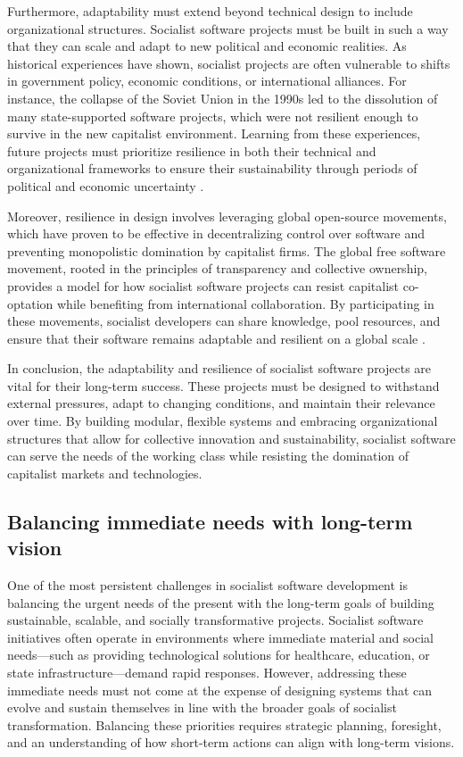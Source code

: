 \begin{refsection}
Furthermore, adaptability must extend beyond technical design to include organizational structures. Socialist software projects must be built in such a way that they can scale and adapt to new political and economic realities. As historical experiences have shown, socialist projects are often vulnerable to shifts in government policy, economic conditions, or international alliances. For instance, the collapse of the Soviet Union in the 1990s led to the dissolution of many state-supported software projects, which were not resilient enough to survive in the new capitalist environment. Learning from these experiences, future projects must prioritize resilience in both their technical and organizational frameworks to ensure their sustainability through periods of political and economic uncertainty \cite[pp.~210-215]{nove1991}.

Moreover, resilience in design involves leveraging global open-source movements, which have proven to be effective in decentralizing control over software and preventing monopolistic domination by capitalist firms. The global free software movement, rooted in the principles of transparency and collective ownership, provides a model for how socialist software projects can resist capitalist co-optation while benefiting from international collaboration. By participating in these movements, socialist developers can share knowledge, pool resources, and ensure that their software remains adaptable and resilient on a global scale \cite[pp.~78-82]{stallman2002}.

In conclusion, the adaptability and resilience of socialist software projects are vital for their long-term success. These projects must be designed to withstand external pressures, adapt to changing conditions, and maintain their relevance over time. By building modular, flexible systems and embracing organizational structures that allow for collective innovation and sustainability, socialist software can serve the needs of the working class while resisting the domination of capitalist markets and technologies.

\subsection{Balancing immediate needs with long-term vision}

One of the most persistent challenges in socialist software development is balancing the urgent needs of the present with the long-term goals of building sustainable, scalable, and socially transformative projects. Socialist software initiatives often operate in environments where immediate material and social needs—such as providing technological solutions for healthcare, education, or state infrastructure—demand rapid responses. However, addressing these immediate needs must not come at the expense of designing systems that can evolve and sustain themselves in line with the broader goals of socialist transformation. Balancing these priorities requires strategic planning, foresight, and an understanding of how short-term actions can align with long-term visions.


\end{refsection}
